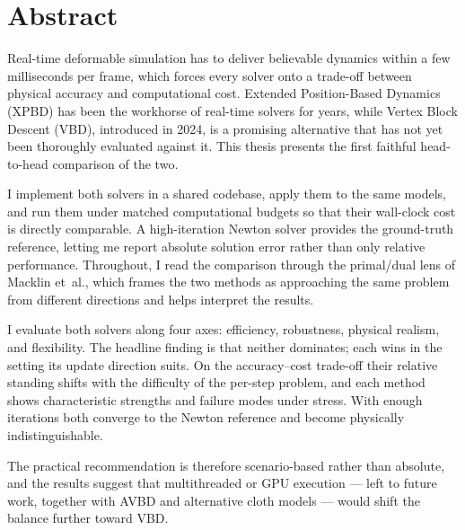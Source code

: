 \vfill
\selectenglish


\chapter*{Abstract}

Real-time deformable simulation has to deliver believable dynamics within a few
milliseconds per frame, which forces every solver onto a trade-off between
physical accuracy and computational cost. Extended Position-Based Dynamics
(XPBD) has been the workhorse of real-time solvers for years, while Vertex Block
Descent (VBD), introduced in 2024, is a promising alternative that has
not yet been thoroughly evaluated against it. This thesis presents the first
faithful head-to-head comparison of the two.

I implement both solvers in a shared codebase, apply them to the same models,
and run them under matched computational budgets so that their wall-clock cost
is directly comparable. A high-iteration Newton solver provides the
ground-truth reference, letting me report absolute solution error rather than
only relative performance. Throughout, I read the comparison through the
primal/dual lens of Macklin et~al., which frames the two methods as approaching
the same problem from different directions and helps interpret the results.

I evaluate both solvers along four axes: efficiency, robustness, physical
realism, and flexibility. The headline finding is that neither dominates;
each wins in the setting its update direction suits. On the accuracy--cost
trade-off their relative standing shifts with the difficulty of the per-step
problem, and each method shows characteristic strengths and failure modes
under stress. With enough iterations both converge to the Newton reference
and become physically indistinguishable.

The practical recommendation is therefore scenario-based rather than absolute,
and the results suggest that multithreaded or GPU execution --- left to future
work, together with AVBD and alternative cloth models --- would shift the
balance further toward VBD.


\vfill
\selectthesislanguage

\setcounter{romanPage}{\value{page}}
